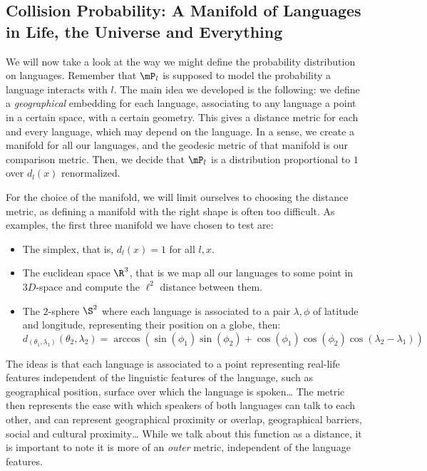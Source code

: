 \documentclass[math, info, english]{cours}
\begin{document}
\subsection{Collision Probability: A Manifold of Languages in Life, the Universe and Everything}\label{colprob}
We will now take a look at the way we might define the probability distribution on languages.
Remember that $\mP_{l}$ is supposed to model the probability a language interacts with $l$.
The main idea we developed is the following: we define a \emph{geographical} embedding for each language, associating to any language a point in a certain space, with a certain geometry.
This gives a distance metric for each and every language, which may depend on the language.
In a sense, we create a manifold for all our languages, and the geodesic metric of that manifold is our comparison metric.
Then, we decide that $\mP_{l}$ is a distribution proportional to $1$ over $d_{l}\left( x \right)$ renormalized.

For the choice of the manifold, we will limit ourselves to choosing the distance metric, as defining a manifold with the right shape is often too difficult.
As examples, the first three manifold we have chosen to test are:
\begin{itemize}
	\item The simplex, that is, $d_{l}(x) = 1$ for all $l, x$.
	\item The euclidean space $\R^{3}$, that is we map all our languages to some point in $3D$-space and compute the $\ell^{2}$ distance between them.
	\item The $2$-sphere $\S^{2}$ where each language is associated to a pair $\lambda, \phi$ of latitude and longitude, representing their position on a globe, then:
	      \begin{equation*}
		      d_{\left( \theta_{1}, \lambda_{1} \right)}\left( \theta_{2}, \lambda_{2} \right) = \arccos\left( \sin \left(\phi_{1}\right) \sin\left( \phi_{2} \right) + \cos\left( \phi_{1} \right)\cos\left( \phi_{2} \right)\cos\left( \lambda_{2} - \lambda_{1} \right) \right)
	      \end{equation*}
\end{itemize}
The ideas is that each language is associated to a point representing real-life features independent of the linguistic features of the language, such as geographical position, surface over which the language is spoken\ldots
The metric then represents the ease with which speakers of both languages can talk to each other, and can represent geographical proximity or overlap, geographical barriers, social and cultural proximity\ldots
While we talk about this function as a distance, it is important to note it is more of an \emph{outer} metric, independent of the language features.
\end{document}
